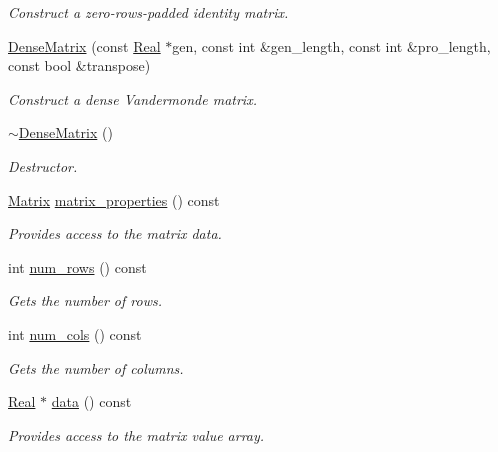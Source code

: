 \begin{DoxyCompactItemize}
\begin{DoxyCompactList}\small\item\em Construct a zero-\/rows-\/padded identity matrix. \end{DoxyCompactList}\item 
\hyperlink{classmtk_1_1DenseMatrix_a4a85c10adb8a1d695c992eb5fd3e3dac}{Dense\+Matrix} (const \hyperlink{group__c01-roots_gac080bbbf5cbb5502c9f00405f894857d}{Real} $\ast$gen, const int \&gen\+\_\+length, const int \&pro\+\_\+length, const bool \&transpose)
\begin{DoxyCompactList}\small\item\em Construct a dense Vandermonde matrix. \end{DoxyCompactList}\item 
\hyperlink{classmtk_1_1DenseMatrix_a8d4a0df33bd4e4edf5d2fe5539885b85}{$\sim$\+Dense\+Matrix} ()
\begin{DoxyCompactList}\small\item\em Destructor. \end{DoxyCompactList}\item 
\hyperlink{classmtk_1_1Matrix}{Matrix} \hyperlink{classmtk_1_1DenseMatrix_abb5e4db5688743c6f9fd9ec6e38ed4ca}{matrix\+\_\+properties} () const 
\begin{DoxyCompactList}\small\item\em Provides access to the matrix data. \end{DoxyCompactList}\item 
int \hyperlink{classmtk_1_1DenseMatrix_a17d8d3b9cc0926044b6972dd190a5c21}{num\+\_\+rows} () const 
\begin{DoxyCompactList}\small\item\em Gets the number of rows. \end{DoxyCompactList}\item 
int \hyperlink{classmtk_1_1DenseMatrix_af6f78373aaf2136f0c78974d7c8de0a8}{num\+\_\+cols} () const 
\begin{DoxyCompactList}\small\item\em Gets the number of columns. \end{DoxyCompactList}\item 
\hyperlink{group__c01-roots_gac080bbbf5cbb5502c9f00405f894857d}{Real} $\ast$ \hyperlink{classmtk_1_1DenseMatrix_a16b3ff56feb2658b9fc7147d1de4d8e7}{data} () const 
\begin{DoxyCompactList}\small\item\em Provides access to the matrix value array. \end{DoxyCompactList}\item 

\end{DoxyCompactItemize}
